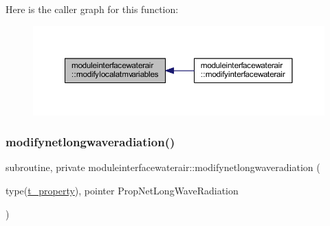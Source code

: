 Here is the caller graph for this function\+:\nopagebreak
\begin{figure}[H]
\begin{center}
\leavevmode
\includegraphics[width=350pt]{namespacemoduleinterfacewaterair_a44a9529a1162816a090c836bc75d3f29_icgraph}
\end{center}
\end{figure}
\mbox{\label{namespacemoduleinterfacewaterair_a446911b7d3595fa04059369d70ebf75e}} 
\subsubsection{\texorpdfstring{modifynetlongwaveradiation()}{modifynetlongwaveradiation()}}
{\footnotesize\ttfamily subroutine, private moduleinterfacewaterair\+::modifynetlongwaveradiation (\begin{DoxyParamCaption}\item[{type(\mbox{\hyperlink{structmoduleinterfacewaterair_1_1t__property}{t\+\_\+property}}), pointer}]{Prop\+Net\+Long\+Wave\+Radiation }\end{DoxyParamCaption})\hspace{0.3cm}{\ttfamily [private]}}


